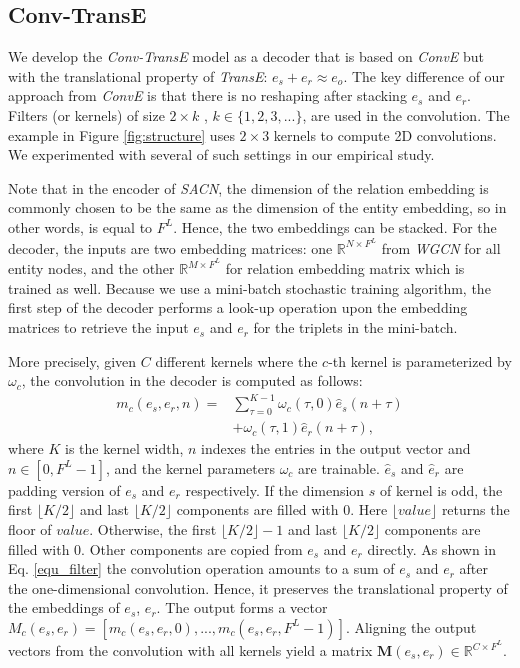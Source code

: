 \documentclass[letterpaper]{article} \usepackage{aaai19}  \usepackage{times}  \usepackage{helvet}  \usepackage{courier}  \usepackage{url}  \usepackage{graphicx}  \usepackage{amsmath}
\begin{document}
\subsection{Conv-TransE}
We develop the {\it Conv-TransE} model as a decoder that is based on {\it ConvE} but with the translational property of {\it TransE}: $e_s + e_r  \approx e_o$. 
The key difference of our approach from {\it ConvE} is that there is no reshaping after stacking $e_s$ and $e_r$.
Filters (or kernels) of size $2 \times k$ , $k \in \{1,2,3,...\}$, are used in the convolution. 
The example in Figure \ref{fig:structure} uses $2 \times 3$ kernels to compute 2D convolutions.
We experimented with several of such settings in our empirical study.

Note that in the encoder of {\it SACN}, 
the dimension of the relation embedding is commonly chosen to be the same as the dimension of the entity embedding, so in other words, is equal to $F^L$. Hence, the two embeddings can be stacked. For the decoder, the inputs are two embedding matrices: one ${\mathbb{R}}^{N \times F^{L}}$ from {\it WGCN} for all entity nodes, and the other ${\mathbb{R}}^{M \times F^{L}}$ for
relation embedding matrix which is trained as well.
Because we use a mini-batch stochastic training algorithm, the first step of the decoder performs a look-up operation upon the embedding matrices to retrieve the input $e_s$ and $e_r$ for the triplets in the mini-batch.

More precisely, given $C$ different kernels where the $c$-th kernel is parameterized by $\omega_c$, the convolution in the decoder is computed as follows:
\begin{equation} 
\label{equ_filter}
\begin{split}
m_c (e_s, e_r, n)  = &  \sum_{\tau=0}^{K-1} \omega_{c}(\tau, 0)\hat{e}_s(n+\tau) \\
& +  \omega_{c}( \tau, 1) \hat{e}_r(n+\tau),  
\end{split}
\end{equation}
where $K$ is the kernel width, $n$ indexes the entries in the output vector and $n \in [0,F^L-1]$, and the kernel parameters $\omega_c$ are trainable. $\hat{e}_s$ and $\hat{e}_r$ 
are padding version of $e_s$ and $e_r$ respectively. 
If the dimension $s$ of kernel is odd, the first $\lfloor K/2 \rfloor$ and last $\lfloor K/2 \rfloor$ components are filled with 0. Here $\lfloor value \rfloor$ returns the floor of $value$.
Otherwise, the first $\lfloor K/2 \rfloor -1$ and last $\lfloor K/2 \rfloor$ components are filled with 0. 
Other components are copied from $e_s$ and $e_r$ directly.
As shown in Eq. \eqref{equ_filter} the convolution operation amounts to a sum of $e_s$ and $e_r$ after the one-dimensional convolution. Hence, it preserves the translational property of the embeddings of $e_s$, $e_r$. The output forms a vector $M_c(e_s,e_r) = [m_c(e_s,e_r,0), ..., m_c(e_s,e_r,F^L-1)]$. Aligning the output vectors from the convolution with all kernels yield a matrix
$\mathbf{M}(e_s, e_r) \in {\mathbb{R}}^{C \times F^L}$.
\end{document}
